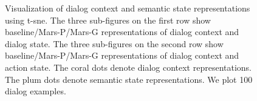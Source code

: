 \begin{figure}[!t]
	\centering
\caption{Visualization of dialog context and semantic state representations using t-sne. The three sub-figures on the first row show baseline/Mars-P/Mars-G representations of dialog context and dialog state. The three sub-figures on the second row show baseline/Mars-P/Mars-G representations of dialog context and action state. The coral dots denote dialog context representations. The plum dots denote semantic state representations.  We plot 100 dialog examples.}\label{tsne}
\end{figure}

